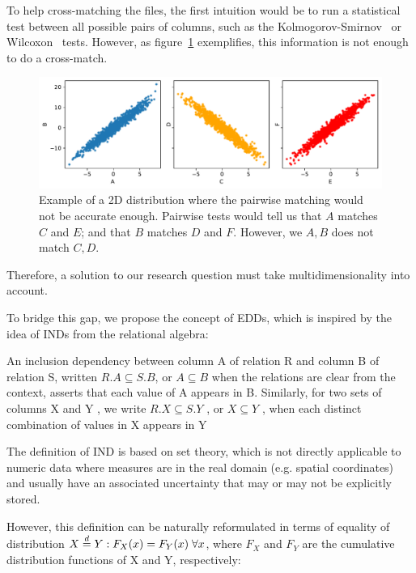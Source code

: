 To help cross-matching the files, the first intuition would be to run a statistical
test between all possible pairs of columns,
such as the Kolmogorov-Smirnov~\cite{Hodges1958} or Wilcoxon~\cite{Wilcoxon1945} tests.
However, as figure~\ref{fig:pairwise_ind} exemplifies, this information is not enough to 
do a cross-match.

\begin{figure}[htpb]
    \centering
    \includegraphics[width=\linewidth]{images/4_gaps/no2ind}
    \caption[Example of a 2D distribution where the pairwise matching is not enough]{
        Example of a 2D distribution where the pairwise matching would not be accurate enough.
        Pairwise tests would tell us that $A$ matches $C$ and $E$; and that $B$ matches $D$ and $F$.
        However, we $A,B$ does not match $C,D$.
    }
    \label{fig:pairwise_ind}
\end{figure}

Therefore, a solution to our research question must take multidimensionality into account.

To bridge this gap, we propose the concept of \glspl{EDD}, which is inspired by the idea of
\glspl{IND} from the relational algebra:

\begin{displayquote}
An inclusion dependency between column A of relation
R and column B of relation S, written $R.A \subseteq S.B$, or $A \subseteq B$
when the relations are clear from the context, asserts that each
value of A appears in B. Similarly, for two sets of columns X
and Y , we write $R.X \subseteq S.Y$ , or $X \subseteq Y$ , when each distinct
combination of values in X appears in Y \cite{abedjan2015}
\end{displayquote}

The definition of \gls{IND} is based on set theory, which is not directly applicable to
numeric data where measures are in the real domain (e.g. spatial coordinates) and usually
have an associated uncertainty that may or may not be explicitly stored.

However, this definition can be naturally reformulated in terms of
equality of distribution $X \stackrel{d}{=} Y: F_X(x) = F_Y(x) \; \forall x$, where $F_X$ and
$F_Y$ are the cumulative distribution functions of X and Y, respectively:


